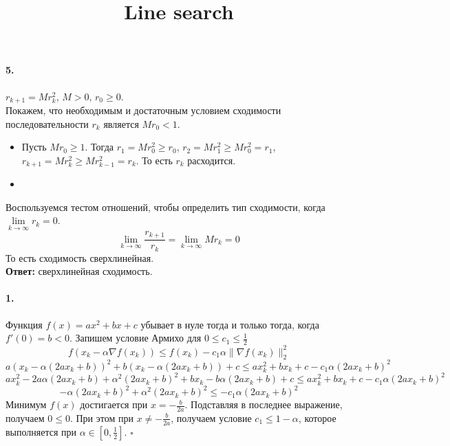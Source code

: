 \documentclass{article}
\newcommand*{\QED}{\null\nobreak\hfill\ensuremath{\square}}
\newcommand*{\1}{\mathbf{1}}
\begin{document}
\paragraph{5.} $r_{k + 1} = Mr_k^2$, $M > 0,\, r_0 \geqslant 0$. \\
Покажем, что необходимым и достаточным условием сходимости последовательности $r_k$ является $Mr_0 < 1$. \\
\begin{itemize}
    \item Пусть $Mr_0 \geqslant 1$. Тогда $r_1 = Mr_0^2 \geqslant r_0$, $r_2 = Mr_1^2 \geqslant Mr_0^2 = r_1$, $r_{k + 1} = Mr_k^2 \geqslant Mr_{k - 1}^2 = r_k$. То есть $r_k$ расходится.
    \item
\end{itemize}
Воспользуемся тестом отношений, чтобы определить тип сходимости, когда $\lim\limits_{k \to \infty} r_k = 0$.
\[ \lim\limits_{k \to \infty} \frac{r_{k + 1}}{r_k} = \lim\limits_{k \to \infty} Mr_k = 0 \]
То есть сходимость сверхлинейная. \\
\textbf{Ответ: } сверхлинейная сходимость.



\title{Line search}
\maketitle
\paragraph{1.} Функция $f(x) = ax^2 + bx + c$ убывает в нуле тогда и только тогда, когда $f'(0) = b < 0$. Запишем условие Армихо для $0 \leqslant c_1 \leqslant \frac12$
\[ f(x_k - \alpha \nabla f(x_k)) \leqslant f(x_k) - c_1 \alpha \| \nabla f(x_k) \|_2^2 \]
\[ a(x_k - \alpha(2ax_k + b))^2 + b(x_k - \alpha(2ax_k + b)) + c \leqslant ax_k^2 + bx_k + c - c_1 \alpha (2ax_k + b)^2 \]
\[ ax_k^2 - 2a \alpha (2ax_k + b) + \alpha^2 (2ax_k + b)^2 + bx_k - b\alpha (2ax_k + b) + c \leqslant ax_k^2 + bx_k + c - c_1 \alpha (2ax_k + b)^2 \]
\[ -\alpha(2ax_k + b)^2 + \alpha^2 (2ax_k + b)^2 \leqslant - c_1 \alpha (2ax_k + b)^2 \]
Минимум $f(x)$ достигается при $x = -\frac{b}{2a}$. Подставляя в последнее выражение, получаем $0 \leqslant 0$. При этом при $x \neq -\frac{b}{2a}$, получаем условие $c_1 \leqslant 1 - \alpha$, которое выполняется при $\alpha \in \left[0, \frac12\right]$. \QED
\end{document}
